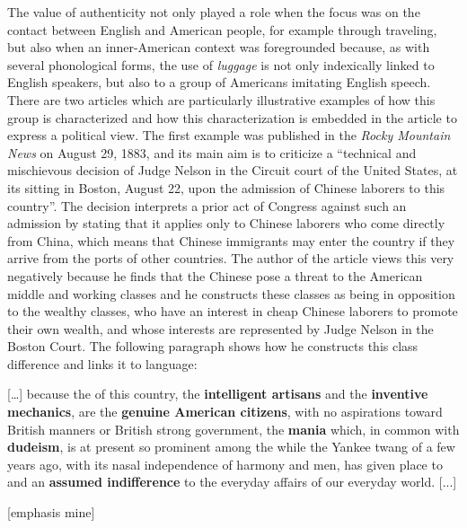 The value of authenticity not only played a role when the focus was on the contact between English and American people, for example through traveling, but also when an inner-American context was foregrounded because, as with several phonological forms, the use of \emph{luggage} is not only indexically linked to English speakers, but also to a group of Americans imitating English speech. There are two articles which are particularly illustrative examples of how this group is characterized and how this characterization is embedded in the article to express a political view. The first example was published in the \emph{Rocky Mountain News} on August 29, 1883, and its main aim is to criticize a “technical and mischievous decision of Judge Nelson in the Circuit court of the United States, at its sitting in Boston, August 22, upon the admission of Chinese laborers to this country”. The decision interprets a prior act of Congress against such an admission by stating that it applies only to Chinese laborers who come directly from China, which means that Chinese immigrants may enter the country if they arrive from the ports of other countries. The author of the article views this very negatively because he finds that the Chinese pose a threat to the American middle and working classes and he constructs these classes as being in opposition to the wealthy classes, who have an interest in cheap Chinese laborers to promote their own wealth, and whose interests are represented by Judge Nelson in the Boston Court. The following paragraph shows how he constructs this class difference and links it to language:

\begin{ipquote}
{[…] because the  of this country, the \textbf{intelligent artisans} and the \textbf{inventive mechanics}, are the \textbf{genuine American citizens}, with no aspirations toward British manners or British strong government, the \textbf{mania} which, in common with \textbf{dudeism}, is at present so prominent among the  while the Yankee twang of a few years ago, with its nasal independence of harmony and men, has given place to  and an \textbf{assumed indifference} to the everyday affairs of our everyday world. {[...]}

\raggedleft
{[emphasis mine]}\\
}
\end{ipquote}


